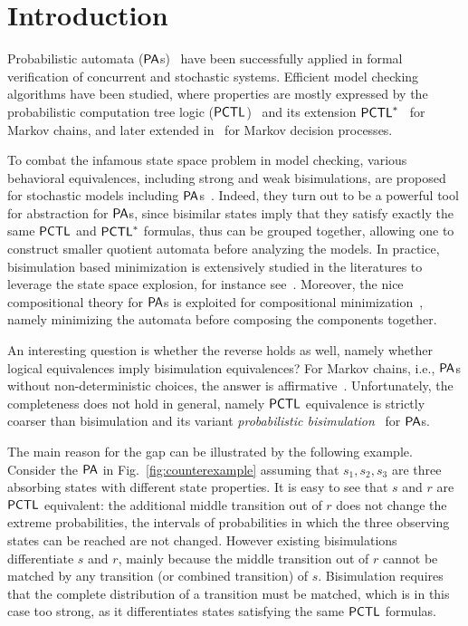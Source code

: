 \documentclass{LMCS}
\newcommand{\PA}{{\sf PA}}
\newcommand{\PCTL}{{\sf PCTL}}
\begin{document}
\section{Introduction}
Probabilistic automata ($\PA$s)~\cite{SegalaL95} have been
successfully applied in formal verification of concurrent and
stochastic systems. Efficient model checking algorithms have been
studied, where properties are mostly expressed by the probabilistic
computation tree logic ($\PCTL$)~\cite{hansson1994logic} and its
extension $\PCTL^{*}$~\cite{Aziz1995UWT} for Markov chains, and later
extended in~\cite{bianco1995model} for Markov decision processes.


To combat the infamous state space problem in model checking, various
behavioral equivalences, including strong and weak bisimulations, are
proposed for stochastic models including
$\PA$s~\cite{LarsenS89,larsen1991bisimulation,Segala-thesis,baier2003comparative,SegalaL95}. Indeed,
they turn out to be a powerful tool for abstraction for $\PA$s, since
bisimilar states imply that they satisfy exactly the same $\PCTL$ and
$\PCTL^{*}$ formulas, thus can be grouped together,
allowing one to construct smaller quotient automata before analyzing
the models.  In practice, bisimulation based minimization is
extensively studied in the literatures to leverage the state space
explosion, for instance see~\cite{CattaniS02,BaierEM00,KatoenKZJ07}.
Moreover, the nice compositional theory for $\PA$s is exploited for
compositional minimization~\cite{BoudaliCS09}, namely minimizing the
automata before composing the components together.


An interesting question is whether the reverse holds as well, namely whether logical equivalences imply bisimulation equivalences?
For Markov chains, i.e.,
$\PA$s without non-deterministic choices, the answer is affirmative~\cite{Aziz1995UWT,BaierKHW05}.
Unfortunately, the completeness does not hold in general, namely $\PCTL$
equivalence is strictly coarser than bisimulation and its variant
\emph{probabilistic bisimulation}~\cite{SegalaL95} for $\PA$s.

The main reason for the gap can be illustrated by the following
example. Consider the $\PA$ in Fig.~\ref{fig:counterexample}
assuming that $s_1,s_2,s_3$ are three absorbing states with different
state properties. It is easy to see that  $s$ and $r$ are $\PCTL$ equivalent:
the additional middle transition out of $r$ does not change the extreme probabilities,
the intervals of probabilities in which the three observing states can be reached are not changed.
However existing bisimulations differentiate $s$ and $r$,
mainly because the middle transition out of $r$ cannot be matched by
any transition (or combined transition) of $s$. Bisimulation requires
that the complete distribution of a transition must be matched, which is in this case too
strong, as it differentiates states satisfying the same $\PCTL$
formulas.
\end{document}
